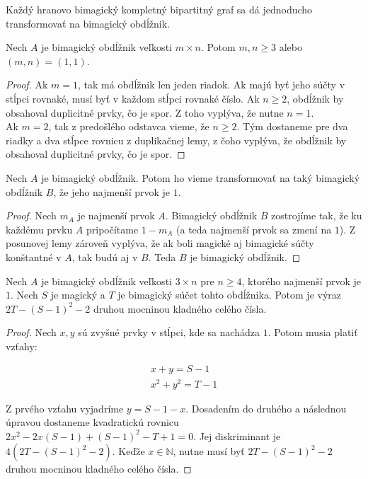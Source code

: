 Každý hranovo bimagický kompletný bipartitný graf sa dá jednoducho transformovať na bimagický obdĺžnik. \\

\begin{theorem}
\label{rectanglemn}
Nech $A$ je bimagický obdĺžnik veľkosti $m \times n$. Potom $m,n \geq 3$ alebo $(m, n) = (1, 1)$.
\end{theorem}

\begin{proof} Ak $m = 1$, tak má obdĺžnik len jeden riadok. Ak majú byť jeho súčty v stĺpci rovnaké, musí byť v každom stĺpci rovnaké číslo. Ak $n \geq 2$, obdĺžnik by obsahoval duplicitné prvky, čo je spor. Z toho vyplýva, že nutne $n = 1$. \\

Ak $m = 2$, tak z predošlého odstavca vieme, že $n \geq 2$. Tým dostaneme pre dva riadky a dva stĺpce rovnicu z duplikačnej lemy, z čoho vyplýva, že obdĺžnik by obsahoval duplicitné prvky, čo je spor.
\end{proof}

\begin{theorem} 
\label{rectangle1}
Nech $A$ je bimagický obdĺžnik. Potom ho vieme transformovať na taký bimagický obdĺžnik $B$, že jeho najmenší prvok je $1$.
\end{theorem}

\begin{proof} Nech $m_A$ je najmenší prvok $A$. Bimagický obdĺžnik $B$ zostrojíme tak, že ku každému prvku $A$ pripočítame $1 - m_A$ (a teda najmenší prvok sa zmení na $1$). Z posunovej lemy zároveň vyplýva, že ak boli magické aj bimagické súčty konštantné v $A$, tak budú aj v $B$. Teda $B$ je bimagický obdĺžnik.
\end{proof}

\begin{theorem} 
\label{rectangle1cond}
Nech $A$ je bimagický obdĺžnik veľkosti $3 \times n$ pre $n \geq 4$, ktorého najmenší prvok je $1$. Nech $S$ je magický a $T$ je bimagický súčet tohto obdĺžnika. Potom je výraz $2T - (S-1)^2 - 2$ druhou mocninou kladného celého čísla.
\end{theorem}

\begin{proof}
Nech $x,y$ sú zvyšné prvky v stĺpci, kde sa nachádza $1$. Potom musia platiť vzťahy:

\begin{gather*}
x + y = S - 1 \\
x^2 + y^2 = T - 1
\end{gather*}

Z prvého vzťahu vyjadríme $y = S - 1 - x$. Dosadením do druhého a následnou úpravou dostaneme kvadratickú rovnicu $2x^2 - 2x(S - 1) + (S - 1)^2 - T + 1 = 0$. Jej diskriminant je $4(2T - (S - 1)^2 - 2)$. Keďže $x \in \mathbb{N}$, nutne musí byť $2T - (S - 1)^2 - 2$ druhou mocninou kladného celého čísla.

\end{proof}

